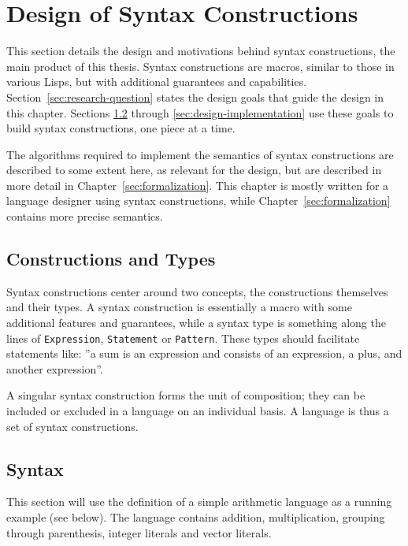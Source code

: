 \documentclass{kththesis}
\begin{document}
\chapter{Design of Syntax Constructions} \label{sec:syntax-constructions}

This section details the design and motivations behind syntax constructions, the main product of this thesis. Syntax constructions are macros, similar to those in various Lisps, but with additional guarantees and capabilities. Section~\ref{sec:research-question} states the design goals that guide the design in this chapter. Sections \ref{sec:design-syntax} through \ref{sec:design-implementation} use these goals to build syntax constructions, one piece at a time.

The algorithms required to implement the semantics of syntax constructions are described to some extent here, as relevant for the design, but are described in more detail in Chapter~\ref{sec:formalization}. This chapter is mostly written for a language designer using syntax constructions, while Chapter~\ref{sec:formalization} contains more precise semantics.

\section{Constructions and Types} \label{sec:constructions-and-types}

Syntax constructions center around two concepts, the constructions themselves and their types. A syntax construction is essentially a macro with some additional features and guarantees, while a syntax type is something along the lines of \texttt{Expression}, \texttt{Statement} or \texttt{Pattern}. These types should facilitate statements like: ''a sum is an expression and consists of an expression, a plus, and another expression''.

A singular syntax construction forms the unit of composition; they can be included or excluded in a language on an individual basis. A language is thus a set of syntax constructions.

\section{Syntax} \label{sec:design-syntax}

This section will use the definition of a simple arithmetic language as a running example (see below). The language contains addition, multiplication, grouping through parenthesis, integer literals and vector literals.
\end{document}

